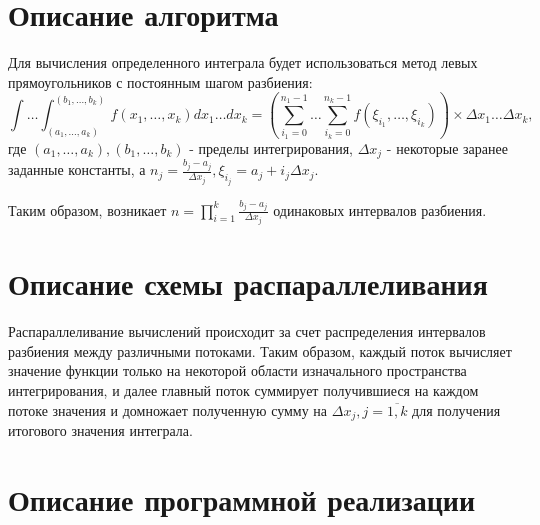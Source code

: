 \documentclass{report}
\begin{document}
\clearpage

\section*{Описание алгоритма}

\par Для вычисления определенного интеграла будет использоваться метод левых прямоугольников с постоянным шагом разбиения: \[ \int\dots\int^{(b_1, \dots, b_k)}_{(a_1, \dots, a_k)} f(x_1, \dots, x_k) dx_1 \dots dx_k = ( \sum\limits_{i_1=0}^{n_1-1} \dots \sum\limits_{i_k=0}^{n_k-1} f(\xi_{i_1}, \dots, \xi_{i_k})) \times \Delta x_1 \dots \Delta x_k , \] где \( (a_1, \dots, a_k), (b_1, \dots, b_k) \) - пределы интегрирования, \( \Delta x_j \) - некоторые заранее заданные константы, а \( n_j = \frac{b_j - a_j}{\Delta x_j}, \xi_{i_j} = a_j + i_j \Delta x_j \).
\par Таким образом, возникает \( n = \prod\limits_{i=1}^k \frac{b_j - a_j}{\Delta x_j}\) одинаковых интервалов разбиения.

\clearpage

\section*{Описание схемы распараллеливания}

\par Распараллеливание вычислений происходит за счет распределения интервалов разбиения между различными потоками. Таким образом, каждый поток вычисляет значение функции только на некоторой области изначального пространства интегрирования, и далее главный поток суммирует получившиеся на каждом потоке значения и домножает полученную сумму на \( \Delta x_j, j=\overline{1,k} \) для получения итогового значения интеграла.

\clearpage

\section*{Описание программной реализации}
\end{document}
